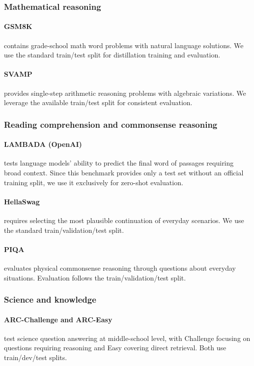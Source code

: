 \documentclass[11pt]{article}
\begin{document}
\subsubsection{Mathematical reasoning}
\paragraph{GSM8K} \citep{cobbe2021gsm8k} contains grade-school math word problems with natural language solutions. We use the standard train/test split for distillation training and evaluation.
\paragraph{SVAMP} \citep{patel2021svamp} provides single-step arithmetic reasoning problems with algebraic variations. We leverage the available train/test split for consistent evaluation.

\subsubsection{Reading comprehension and commonsense reasoning}
\paragraph{LAMBADA (OpenAI)} \citep{paperno2016lambada} tests language models' ability to predict the final word of passages requiring broad context. Since this benchmark provides only a test set without an official training split, we use it exclusively for zero-shot evaluation.
\paragraph{HellaSwag} \citep{zellers2019hellaswag} requires selecting the most plausible continuation of everyday scenarios. We use the standard train/validation/test split.
\paragraph{PIQA} \citep{bisk2019piqa} evaluates physical commonsense reasoning through questions about everyday situations. Evaluation follows the train/validation/test split.

\subsubsection{Science and knowledge}
\paragraph{ARC-Challenge and ARC-Easy} \citep{clark2018arc} test science question answering at middle-school level, with Challenge focusing on questions requiring reasoning and Easy covering direct retrieval. Both use train/dev/test splits.
\end{document}
